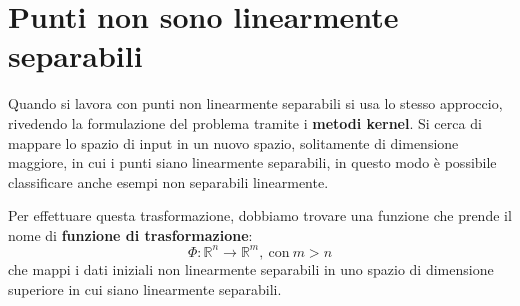 \section{Punti non sono linearmente separabili}
Quando si lavora con punti non linearmente separabili si usa lo stesso approccio,
rivedendo la formulazione del problema tramite i \textbf{metodi kernel}.
Si cerca di mappare lo spazio di input in un nuovo spazio, solitamente di
dimensione maggiore, in cui i punti siano linearmente separabili, in questo modo
è possibile classificare anche esempi non separabili linearmente.

Per effettuare questa trasformazione, dobbiamo trovare una funzione che prende
il nome di \textbf{funzione di trasformazione}:
\begin{equation}
    \Phi: \mathbb{R}^n \to \mathbb{R}^m, \ \text{con} \ m > n
\end{equation}
che mappi i dati iniziali non linearmente separabili in uno spazio di dimensione
superiore in cui siano linearmente separabili.

